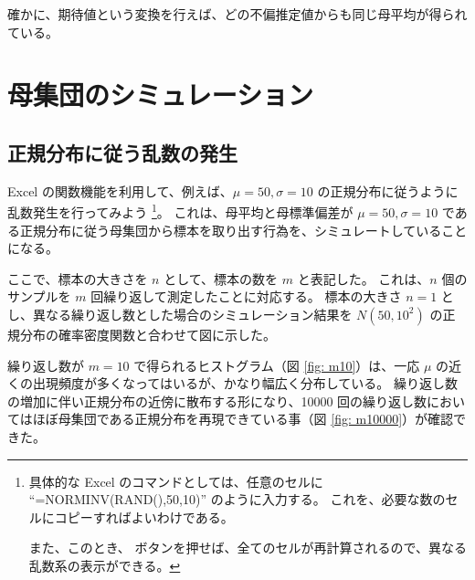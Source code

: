 \documentclass[uplatex,11pt,a4paper]{jsarticle}
\begin{document}
確かに、期待値という変換を行えば、どの不偏推定値からも同じ母平均が得られている。

\newpage

\section{母集団のシミュレーション}

\subsection{正規分布に従う乱数の発生}

Excel の関数機能を利用して、例えば、$\mu = 50, \sigma = 10$ の正規分布に従うように乱数発生を行ってみよう
\footnote
{
具体的な Excel のコマンドとしては、任意のセルに ``=NORMINV(RAND(),50,10)'' のように入力する。
これを、必要な数のセルにコピーすればよいわけである。

また、このとき、 ボタンを押せば、全てのセルが再計算されるので、異なる乱数系の表示ができる。
}。
これは、母平均と母標準偏差が $\mu = 50, \sigma = 10$ である正規分布に従う母集団から標本を取り出す行為を、シミュレートしていることになる。

ここで、標本の大きさを $n$ として、標本の数を $m$ と表記した。
これは、$n$ 個のサンプルを $m$ 回繰り返して測定したことに対応する。
標本の大きさ $n=1 $ とし、異なる繰り返し数とした場合のシミュレーション結果を  $N(50, 10^2)$ の正規分布の確率密度関数と合わせて図に示した。

繰り返し数が $m=10$ で得られるヒストグラム（図 \ref{fig: m10}）は、一応 $\mu$ の近くの出現頻度が多くなってはいるが、かなり幅広く分布している。
繰り返し数の増加に伴い正規分布の近傍に散布する形になり、10000 回の繰り返し数においてはほぼ母集団である正規分布を再現できている事（図 \ref{fig: m10000}）が確認できた。
\end{document}
